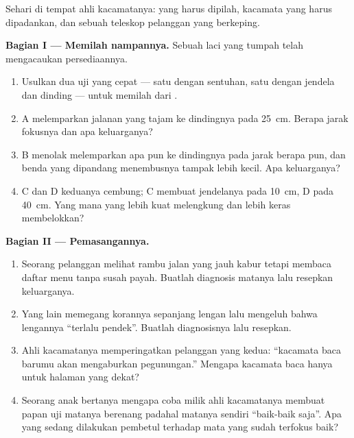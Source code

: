 \begin{problem}\label{pb:g8:lenses-images:1}
Sehari di tempat ahli kacamatanya:  yang harus dipilah, kacamata
yang harus dipadankan, dan sebuah teleskop pelanggan yang berkeping.

\medskip\noindent\textbf{Bagian I --- Memilah nampannya.}
Sebuah laci yang tumpah telah mengacaukan persediaannya.
\begin{enumerate}
  \item Usulkan dua uji yang cepat --- satu dengan sentuhan, satu
        dengan jendela dan dinding --- untuk memilah 
        dari .
  \item {} A melemparkan  jalanan yang tajam ke dindingnya
        pada \qty{25}{cm}. Berapa jarak fokusnya dan apa keluarganya?
  \item {} B menolak melemparkan  apa pun ke dindingnya
        pada jarak berapa pun, dan benda yang dipandang menembusnya
        tampak lebih kecil. Apa keluarganya?
  \item {} C dan D keduanya cembung; C membuat  jendelanya
        pada \qty{10}{cm}, D pada \qty{40}{cm}. Yang mana yang lebih
        kuat melengkung dan lebih keras membelokkan?
\end{enumerate}

\medskip\noindent\textbf{Bagian II --- Pemasangannya.}
\begin{enumerate}[resume]
  \item Seorang pelanggan melihat rambu jalan yang jauh kabur tetapi
        membaca daftar menu tanpa susah payah. Buatlah diagnosis
        matanya lalu resepkan keluarganya.
  \item Yang lain memegang korannya sepanjang lengan lalu mengeluh
        bahwa lengannya ``terlalu pendek''. Buatlah diagnosisnya lalu
        resepkan.
  \item Ahli kacamatanya memperingatkan pelanggan yang kedua:
        ``kacamata baca barumu akan mengaburkan pegunungan.'' Mengapa
        kacamata baca hanya untuk halaman yang dekat?
  \item Seorang anak bertanya mengapa  coba milik ahli
        kacamatanya membuat papan uji matanya berenang padahal
        matanya sendiri ``baik-baik saja''. Apa yang sedang dilakukan
         pembetul terhadap mata yang sudah terfokus baik?
\end{enumerate}


\end{problem}
